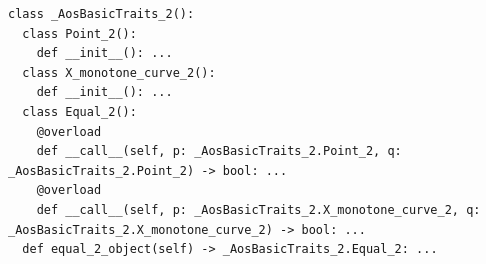\begin{lstfloat}
\begin{lstlisting}[style=pythonFramedStyle,basicstyle=\scriptsize,%
                   label={lst:py:aosBasicTraits},%
                   caption={Partial type annotation for the attributes that correspond to the concept \cppLstinline{AosBasicTraits_2}.}]
class _AosBasicTraits_2():
  class Point_2():
    def __init__(): ...
  class X_monotone_curve_2():
    def __init__(): ...
  class Equal_2(): 
    @overload
    def __call__(self, p: _AosBasicTraits_2.Point_2, q: _AosBasicTraits_2.Point_2) -> bool: ...
    @overload
    def __call__(self, p: _AosBasicTraits_2.X_monotone_curve_2, q: _AosBasicTraits_2.X_monotone_curve_2) -> bool: ...
  def equal_2_object(self) -> _AosBasicTraits_2.Equal_2: ...
\end{lstlisting}
\end{lstfloat}
